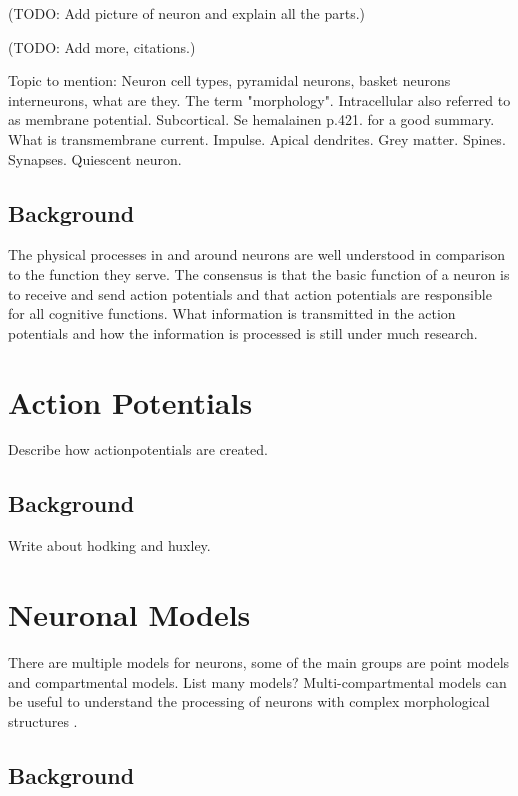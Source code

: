 \documentclass[altfont, fleqn]{uiophd}
\begin{document}
(TODO: Add picture of neuron and explain all the parts.)

(TODO: Add more, citations.)

Topic to mention:
Neuron cell types, pyramidal neurons, basket neurons interneurons, what 
are they. The term "morphology". Intracellular also referred to as membrane potential.
Subcortical. Se hemalainen p.421. for a good summary. What is transmembrane current. 
Impulse. Apical dendrites. Grey matter. Spines. Synapses. Quiescent neuron.


\subsection*{Background}
The physical processes in and around neurons are well understood in comparison
to the function they serve. 
The consensus is that the basic function of a neuron is to receive and send 
action potentials and that action potentials are 
responsible for all cognitive functions.
What information is transmitted in the action potentials and how 
the information is processed is still under much research.  

\section{Action Potentials}
Describe how actionpotentials are created. 

\subsection*{Background}
Write about hodking and huxley. \cite{hodgkin_quantitative_1952}

\section{Neuronal Models}
There are multiple models for neurons, some of the main groups are 
point models and compartmental models. List many models?
Multi-compartmental models 
can be useful to understand the processing of neurons with
complex morphological structures
\cite{sterratt_principles_2011}. 
\subsection*{Background}
\textcites{hodgkin_quantitative_1952,connor_prediction_1971,sterratt_principles_2011}
\end{document}
